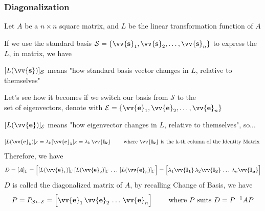\documentclass[11pt]{article}
\DeclareRobustCommand{\myvec}[1]{\vv{\mathbf{#1}}}
\newcommand{\myset}[1]{\mathcal{#1}}
\newcommand{\mymat}[1]{#1}
\begin{document}
    \begin{minipage}{\textwidth}
        \subsubsection{Diagonalization}
        Let $\mymat{A}$ be a $n \times n$ square matrix, and $\mymat{L}$ be the linear transformation function of $\mymat{A}$ 
        \vspace{2ex}

        If we use the standard basis $\myset{S} = \{ \myvec{s}_1, \myvec{s}_2, \dots, \myvec{s}_n \}$ to express the $\mymat{L}$, in matrix, we have 
        \vspace{1ex}
    
        $[\mymat{L}(\myvec{s})]_\myset{S}$ means "how standard basis vector changes in $\mymat{L}$, relative to themselves"
        \vspace{2ex}
        
        Let's see how it becomes if we switch our basis from $\myset{S}$ to the \\
        set of eigenvectors, denote with $\myset{E} = \{ \myvec{e}_1, \myvec{e}_2, \dots, \myvec{e}_n \}$ 
        \vspace{1ex}
    
        $[\mymat{L}(\myvec{e})]_\myset{E}$ means "how eigenvector changes in $\mymat{L}$, relative to themselves", so...
      
        \[ [\mymat{L}(\myvec{e}_k)]_\myset{E} = \lambda_k [\myvec{e}_k]_{\myset{E}} = \lambda_k\,\myvec{\mymat{I}_k} \qquad \text{ where $\myvec{\mymat{I}_k}$ is the k-th column of the Identity Matrix }\]
        Therefore, we have
        \begin{equation}
            \mymat{D} = [\mymat{A}]_{\myset{E}} = \Big[ [\mymat{L}(\myvec{e}_1)]_\myset{E}\,[\mymat{L}(\myvec{e}_2)]_\myset{E}\,\dots\,[\mymat{L}(\myvec{e}_n)]_\myset{E} \Big] = \Big[ \lambda_1\myvec{\mymat{I}_1}\,\lambda_2\myvec{\mymat{I}_2}\,\dots\,\lambda_n\myvec{\mymat{I}_n} \Big]
        \end{equation}
        $\mymat{D}$ is called the diagonalized matrix of $\mymat{A}$, by recalling Change of Basis, we have
        \begin{equation}
            \mymat{P} = \mymat{P}_{\myset{S}\leftarrow\myset{E}} = \Big[ \myvec{e}_1\,\myvec{e}_2\,\dots\,\myvec{e}_n \Big] \qquad \text{ where }\mymat{P}\text{ suits }\mymat{D} = \mymat{P}^{-1} \mymat{A} \mymat{P}
        \end{equation}
    \end{minipage}
    
\end{document}
